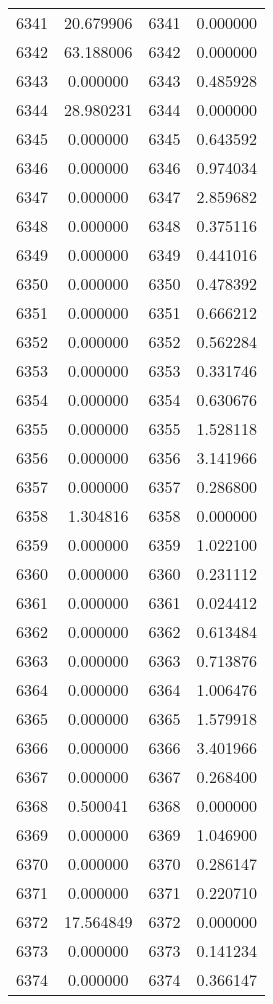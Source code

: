 \documentclass[12pt]{article}
\begin{document}
\begin{longtable}{@{}cccc@{}}
6341 & 20.679906 & 6341 & 0.000000 \\
6342 & 63.188006 & 6342 & 0.000000 \\
6343 & 0.000000 & 6343 & 0.485928 \\
6344 & 28.980231 & 6344 & 0.000000 \\
6345 & 0.000000 & 6345 & 0.643592 \\
6346 & 0.000000 & 6346 & 0.974034 \\
6347 & 0.000000 & 6347 & 2.859682 \\
6348 & 0.000000 & 6348 & 0.375116 \\
6349 & 0.000000 & 6349 & 0.441016 \\
6350 & 0.000000 & 6350 & 0.478392 \\
6351 & 0.000000 & 6351 & 0.666212 \\
6352 & 0.000000 & 6352 & 0.562284 \\
6353 & 0.000000 & 6353 & 0.331746 \\
6354 & 0.000000 & 6354 & 0.630676 \\
6355 & 0.000000 & 6355 & 1.528118 \\
6356 & 0.000000 & 6356 & 3.141966 \\
6357 & 0.000000 & 6357 & 0.286800 \\
6358 & 1.304816 & 6358 & 0.000000 \\
6359 & 0.000000 & 6359 & 1.022100 \\
6360 & 0.000000 & 6360 & 0.231112 \\
6361 & 0.000000 & 6361 & 0.024412 \\
6362 & 0.000000 & 6362 & 0.613484 \\
6363 & 0.000000 & 6363 & 0.713876 \\
6364 & 0.000000 & 6364 & 1.006476 \\
6365 & 0.000000 & 6365 & 1.579918 \\
6366 & 0.000000 & 6366 & 3.401966 \\
6367 & 0.000000 & 6367 & 0.268400 \\
6368 & 0.500041 & 6368 & 0.000000 \\
6369 & 0.000000 & 6369 & 1.046900 \\
6370 & 0.000000 & 6370 & 0.286147 \\
6371 & 0.000000 & 6371 & 0.220710 \\
6372 & 17.564849 & 6372 & 0.000000 \\
6373 & 0.000000 & 6373 & 0.141234 \\
6374 & 0.000000 & 6374 & 0.366147 \\

\end{longtable}
\end{document}
